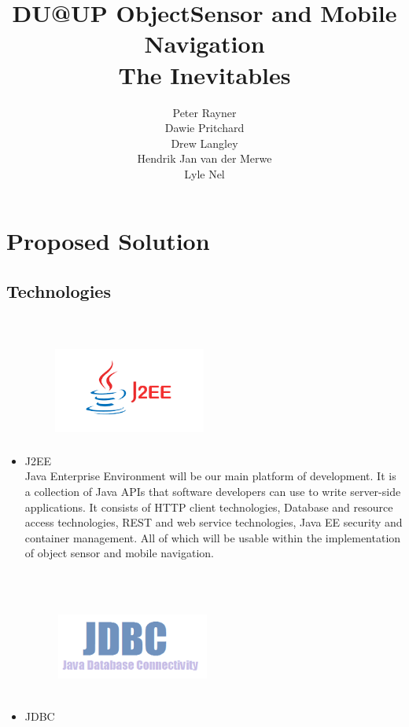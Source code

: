 \documentclass{article}
\title{DU@UP ObjectSensor and Mobile Navigation \\
The Inevitables
}
\author{  
            Peter Rayner\\
            Dawie Pritchard\\
            Drew Langley\\
            Hendrik Jan van der Merwe\\
            Lyle Nel\\
        }
\begin{document}
\maketitle

\newpage

\tableofcontents

\newpage


\section{Proposed Solution}

\subsection{Technologies}
\begin{itemize}
	\item J2EE 
		\includegraphics[width=5cm,height=5cm,keepaspectratio]{j2ee-logo.png} \\
	Java Enterprise Environment will be our main platform of development. It is a collection of Java APIs that software developers can use to write server-side applications.
	It consists of HTTP client technologies, Database and resource access technologies, REST and web service technologies, Java EE security and container management.
	All of which will be usable within the implementation of object sensor and mobile navigation.
	\item JDBC
		\includegraphics[width=5cm,height=5cm,keepaspectratio]{jdbc.png} \\

\end{itemize}
\end{document}
